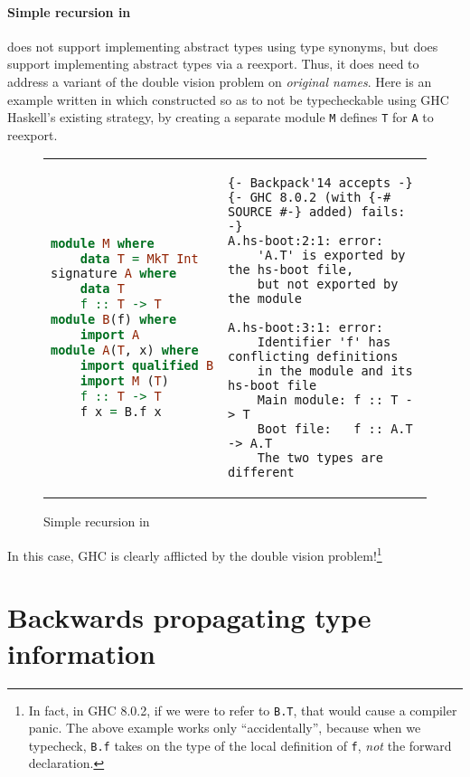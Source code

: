 \paragraph{Simple recursion in \OldBackpack{}}
\OldBackpack{} does not support implementing abstract types using type
synonyms, but does support implementing abstract types via a reexport.
Thus, it does need to address a variant of the double vision problem
on \emph{original names}.  Here is an example written in \OldBackpack{}
which constructed so as to not be typecheckable using GHC Haskell's existing strategy,
by creating a separate module \verb|M| defines \verb|T|
for \verb|A| to reexport.

\begin{figure}[H]
\begin{tabular}{p{} p{}}
\begin{lstlisting}[language=Haskell,escapechar=@]
module M where
    data T = MkT Int
signature A where
    data T
    f :: T -> T
module B(f) where
    import A
module A(T, x) where
    import qualified B
    import M (T)
    f :: T -> T
    f x = B.f x
\end{lstlisting}
&
\begin{verbatim}
{- Backpack'14 accepts -}
{- GHC 8.0.2 (with {-# SOURCE #-} added) fails: -}
A.hs-boot:2:1: error:
    'A.T' is exported by the hs-boot file,
    but not exported by the module

A.hs-boot:3:1: error:
    Identifier 'f' has conflicting definitions
    in the module and its hs-boot file
    Main module: f :: T -> T
    Boot file:   f :: A.T -> A.T
    The two types are different
\end{verbatim}
\end{tabular}
\caption{Simple recursion in \OldBackpack{}}
\label{fig:double-vision-simple-recursion-old-backpack}
\end{figure}

\noindent
In this case, GHC is clearly afflicted by the double vision
problem!\footnote{In fact, in GHC 8.0.2, if we were to refer to
\texttt{B.T}, that would cause a compiler panic.  The above example works
only ``accidentally'', because when we typecheck, \texttt{B.f} takes
on the type of the local definition of \texttt{f}, \emph{not} the
forward declaration.}

\section{Backwards propagating type information}

